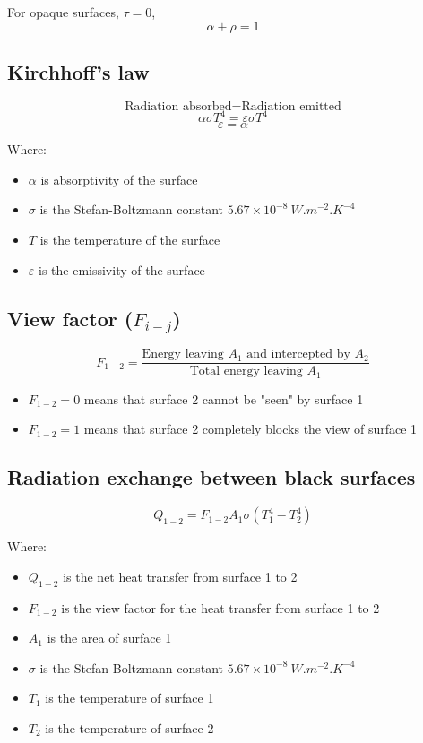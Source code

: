 \documentclass[11pt]{article}
\begin{document}
For opaque surfaces, \(\tau = 0\),
\[\alpha + \rho = 1\]
\subsection{Kirchhoff's law}
\label{sec:org728d56c}
\[\text{Radiation absorbed} = \text{Radiation emitted}\]
\[\alpha \sigma T^4 = \varepsilon \sigma T^4\]
\[\varepsilon = \alpha\]

Where:
\begin{itemize}
\item \(\alpha\) is absorptivity of the surface
\item \(\sigma\) is the Stefan-Boltzmann constant \(5.67 \times 10^{-8} \ \unit{W.m^{-2}.K^{-4}}\)
\item \(T\) is the temperature of the surface
\item \(\varepsilon\) is the emissivity of the surface
\end{itemize}
\subsection{View factor (\(F_{i-j}\))}
\label{sec:orgef3f682}
\[F_{1-2} = \frac{\text{Energy leaving $A_1$ and intercepted by $A_2$}}{\text{Total energy leaving $A_1$}}\]

\begin{itemize}
\item \(F_{1-2} = 0\) means that surface 2 cannot be "seen" by surface 1
\item \(F_{1-2} = 1\) means that surface 2 completely blocks the view of surface 1
\end{itemize}

 \newpage
\subsection{Radiation exchange between black surfaces}
\label{sec:org74a6615}
\[Q_{1-2} = F_{1-2} A_1 \sigma \left(T_1^4 - T_2^4 \right)\]

Where:
\begin{itemize}
\item \(Q_{1-2}\) is the net heat transfer from surface 1 to 2
\item \(F_{1-2}\) is the view factor for the heat transfer from surface 1 to 2
\item \(A_1\) is the area of surface 1
\item \(\sigma\) is the Stefan-Boltzmann constant \(5.67 \times 10^{-8} \ \unit{W.m^{-2}.K^{-4}}\)
\item \(T_1\) is the temperature of surface 1
\item \(T_2\) is the temperature of surface 2
\end{itemize}
\end{document}
